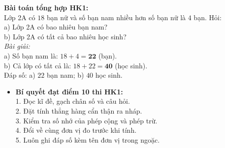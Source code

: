 \documentclass[11pt,a4paper]{article}
\begin{document}
\vspace{-1.5mm}
\noindent
\begin{minipage}[t]{0.49\textwidth}\vspace{0pt}
\begin{tcolorbox}[
  enhanced,
  colback=green!4!white,
  colframe=green!60!black,
  arc=2mm, boxrule=0.8pt,
  left=2mm, right=2mm, top=1.8mm, bottom=1.8mm,
  title={\footnotesize\bfseries\color{white}\faCheckCircle\ 4. Ví dụ thực hành chuẩn mực}
]
{\footnotesize
\textbf{Bài toán tổng hợp HK1:}\\
Lớp 2A có $18$ bạn nữ và số bạn nam nhiều hơn số bạn nữ là $4$ bạn. Hỏi:\\
a) Lớp 2A có bao nhiêu bạn nam?\\
b) Lớp 2A có tất cả bao nhiêu học sinh?\\
\textit{Bài giải:}\\
a) Số bạn nam là: $18 + 4 = \mathbf{22}$ (bạn).\\
b) Cả lớp có tất cả là: $18 + 22 = \mathbf{40}$ (học sinh).\\
Đáp số: a) $22$ bạn nam; b) $40$ học sinh.
}
\end{tcolorbox}
\end{minipage}
\hfill
\begin{minipage}[t]{0.49\textwidth}\vspace{0pt}
\begin{tcolorbox}[
  enhanced,
  colback=red!4!white,
  colframe=red!75!black,
  arc=2mm, boxrule=0.8pt,
  left=2mm, right=2mm, top=1.8mm, bottom=1.8mm,
  title={\footnotesize\bfseries\color{white}\faExclamationTriangle\ 5. Mẹo tránh bẫy trắc nghiệm}
]
{\footnotesize
\begin{itemize}\setlength{\itemsep}{1pt}\setlength{\leftskip}{-2.5mm}
  \item \textbf{Bí quyết đạt điểm 10 thi HK1:}\\
  1. Đọc kĩ đề, gạch chân số và câu hỏi.\\
  2. Đặt tính thẳng hàng cẩn thận ra nháp.\\
  3. Kiểm tra số nhớ của phép cộng và phép trừ.\\
  4. Đổi về cùng đơn vị đo trước khi tính.\\
  5. Luôn ghi đáp số kèm tên đơn vị trong ngoặc.
\end{itemize}
}
\end{tcolorbox}
\end{minipage}
\end{document}
